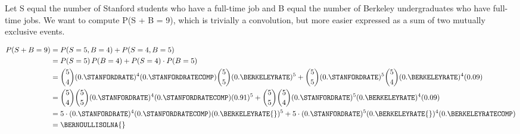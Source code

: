 Let S equal the number of Stanford students who have a full-time job and B equal the number of Berkeley undergraduates who have full-time jobs.  We want to compute P(S + B = 9), which is trivially a convolution, but more easier expressed as a sum of two mutually exclusive events.

\begin{equation*}
\begin{split}
P(S + B = 9) &= P(S = 5, B = 4) + P(S = 4, B = 5) \\
             &= P(S = 5) \, P(B = 4) + P(S = 4)\cdot P(B = 5) \\
             &= \binom{5}{4} (0.\STANFORDRATE)^{4} (0.\STANFORDRATECOMP) \binom{5}{5} (0.\BERKELEYRATE)^{5} + \binom{5}{5} (0.\STANFORDRATE)^{5} \binom{5}{4} (0.\BERKELEYRATE)^{4} (0.09) \\
             &= \binom{5}{4} \binom{5}{5} (0.\STANFORDRATE)^{4} (0.\STANFORDRATECOMP) (0.91)^{5} + \binom{5}{5} \binom{5}{4} (0.\STANFORDRATE)^{5} (0.\BERKELEYRATE)^{4} (0.09) \\
             &= 5 \cdot (0.\STANFORDRATE)^{4} (0.\STANFORDRATECOMP) (0.\BERKELEYRATE{})^{5} + 5 \cdot (0.\STANFORDRATE)^{5} (0.\BERKELEYRATE{})^{4} (0.\BERKELEYRATECOMP) \\
             &= \BERNOULLISOLNA{}
\end{split}
\end{equation*}